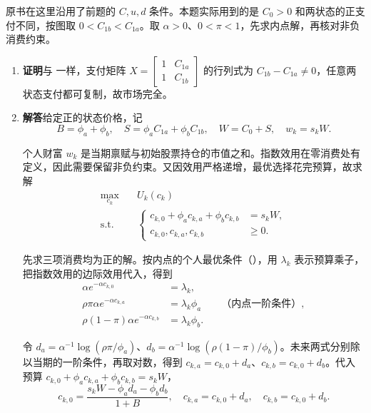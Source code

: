 \begin{solution}[blank-type=manual,blank-vsep=10\baselineskip]
原书在这里沿用了前题的 $C,u,d$ 条件。本题实际用到的是 $C_0>0$ 和两状态的正支付不同，按图取 $0<C_{1b}<C_{1a}$。取 $\alpha>0$、$0<\pi<1$，先求内点解，再核对非负消费约束。
\begin{enumerate}[label=(\alph*)]
 \item \textbf{证明}\quad 与 一样，支付矩阵 $X=\begin{bmatrix}1&C_{1a}\\1&C_{1b}\end{bmatrix}$ 的行列式为 $C_{1b}-C_{1a}\ne0$，任意两状态支付都可复制，故市场完全。

 \item \textbf{解答}\quad 给定正的状态价格，记
 \[
 B=\phi_a+\phi_b,\quad S=\phi_aC_{1a}+\phi_bC_{1b},\quad
 W=C_0+S,\quad w_k=s_kW.
 \]

 个人财富 $w_k$ 是当期禀赋与初始股票持仓的市值之和。指数效用在零消费处有定义，因此需要保留非负约束。又因效用严格递增，最优选择花完预算，故求解
 \[
 \begin{aligned}
 \max_{c_k}\quad &U_k(c_k)\\
 \text{s.t.}\quad &
 \left\{\begin{aligned}
 c_{k,0}+\phi_ac_{k,a}+\phi_bc_{k,b}&=s_kW,\\
 c_{k,0},c_{k,a},c_{k,b}&\ge0.
 \end{aligned}\right.
 \end{aligned}
 \]

 先求三项消费均为正的解。按内点的个人最优条件\ifdefined\WJHandoutKnowledge（）\fi，用 $\lambda_k$ 表示预算乘子，把指数效用的边际效用代入，得到
 \[
 \begin{aligned}
 \alpha e^{-\alpha c_{k,0}}&=\lambda_k,\\
 \rho\pi\alpha e^{-\alpha c_{k,a}}&=\lambda_k\phi_a
     \qquad\text{（内点一阶条件）},\\
 \rho(1-\pi)\alpha e^{-\alpha c_{k,b}}&=\lambda_k\phi_b .
 \end{aligned}
 \]

 令 $d_a=\alpha^{-1}\log(\rho\pi/\phi_a)$、$d_b=\alpha^{-1}\log(\rho(1-\pi)/\phi_b)$。未来两式分别除以当期的一阶条件，再取对数，得到 $c_{k,a}=c_{k,0}+d_a$、$c_{k,b}=c_{k,0}+d_b$。代入预算 $c_{k,0}+\phi_ac_{k,a}+\phi_bc_{k,b}=s_kW$，
 \[
 c_{k,0}=\frac{s_kW-\phi_ad_a-\phi_bd_b}{1+B},\quad
 c_{k,a}=c_{k,0}+d_a,\quad c_{k,b}=c_{k,0}+d_b.
 \]


\end{enumerate}
\end{solution}
